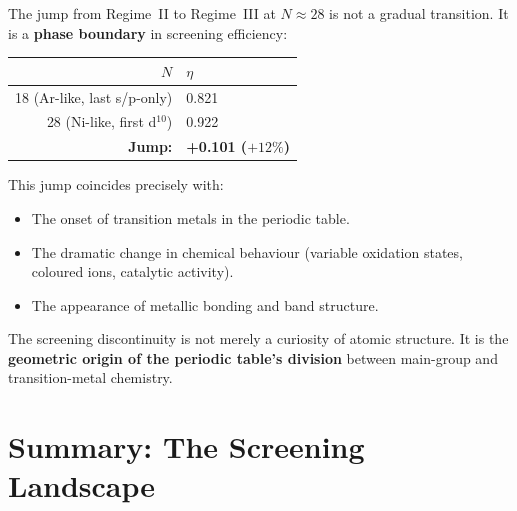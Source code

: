 The jump from Regime~II to Regime~III at $N \approx 28$ is not a gradual transition.  It is a \textbf{phase boundary} in screening efficiency:

\begin{center}
\begin{tabular}{rl}
\toprule
$N$ & $\eta$ \\
\midrule
18 (Ar-like, last s/p-only) & 0.821 \\
28 (Ni-like, first d$^{10}$) & 0.922 \\
\midrule
\textbf{Jump:} & \textbf{+0.101 ($+12\%$)} \\
\bottomrule
\end{tabular}
\end{center}

This jump coincides precisely with:
\begin{itemize}
  \item The onset of transition metals in the periodic table.
  \item The dramatic change in chemical behaviour (variable oxidation states, coloured ions, catalytic activity).
  \item The appearance of metallic bonding and band structure.
\end{itemize}

The screening discontinuity is not merely a curiosity of atomic structure.  It is the \textbf{geometric origin of the periodic table's division} between main-group and transition-metal chemistry.


\section{Summary: The Screening Landscape}
\label{sec:screening-summary}

